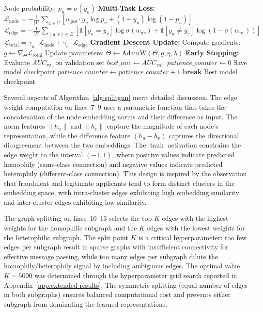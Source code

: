 \begin{algorithm}[H]
\begin{algorithmic}[1]
        \STATE Node probability: $p_u = \sigma(\hat{y}_u)$
    \ENDFOR
    \STATE \textbf{Multi-Task Loss:}
    \STATE $\mathcal{L}_{\text{node}} = -\frac{1}{|V|} \sum_{u \in V} \left[w_{\text{pos}} \cdot y_u \log p_u + (1 - y_u) \log(1 - p_u)\right]$
    \STATE $\mathcal{L}_{\text{edge}} = -\frac{1}{|E|} \sum_{(u,v) \in E} \left[\mathbb{1}[y_u = y_v] \log \sigma(w_{uv}) + \mathbb{1}[y_u \neq y_v] \log(1 - \sigma(w_{uv}))\right]$
    \STATE $\mathcal{L}_{\text{total}} = \gamma_n \cdot \mathcal{L}_{\text{node}} + \gamma_e \cdot \mathcal{L}_{\text{edge}}$
    \STATE \textbf{Gradient Descent Update:}
    \STATE Compute gradients: $g \leftarrow \nabla_\Theta \mathcal{L}_{\text{total}}$
    \STATE Update parameters: $\Theta \leftarrow \text{AdamW}(\Theta, g, \eta, \lambda)$
    \STATE \textbf{Early Stopping:}
    \STATE Evaluate $AUC_{\text{val}}$ on validation set
        \STATE $best\_auc \leftarrow AUC_{\text{val}}$; $patience\_counter \leftarrow 0$
        \STATE Save model checkpoint
    \ELSE
        \STATE $patience\_counter \leftarrow patience\_counter + 1$
            \STATE \textbf{break}
        \ENDIF
    \ENDIF
\ENDFOR
\RETURN Best model checkpoint
\end{algorithmic}
\end{algorithm}

Several aspects of Algorithm~\ref{alg:splitgnn} merit detailed discussion. The edge weight computation on lines~7--9 uses a parametric function that takes the concatenation of the node embedding norms and their difference as input. The norm features $\|h_u\|$ and $\|h_v\|$ capture the magnitude of each node's representation, while the difference feature $(h_u - h_v)$ captures the directional disagreement between the two embeddings. The $\tanh$ activation constrains the edge weight to the interval $(-1, 1)$, where positive values indicate predicted homophily (same-class connection) and negative values indicate predicted heterophily (different-class connection). This design is inspired by the observation that fraudulent and legitimate applicants tend to form distinct clusters in the embedding space, with intra-cluster edges exhibiting high embedding similarity and inter-cluster edges exhibiting low similarity.

The graph splitting on lines~10--13 selects the top-$K$ edges with the highest weights for the homophilic subgraph and the $K$ edges with the lowest weights for the heterophilic subgraph. The split point $K$ is a critical hyperparameter: too few edges per subgraph result in sparse graphs with insufficient connectivity for effective message passing, while too many edges per subgraph dilute the homophily/heterophily signal by including ambiguous edges. The optimal value $K = 5000$ was determined through the hyperparameter grid search reported in Appendix~\ref{app:extended-results}. The symmetric splitting (equal number of edges in both subgraphs) ensures balanced computational cost and prevents either subgraph from dominating the learned representations.


